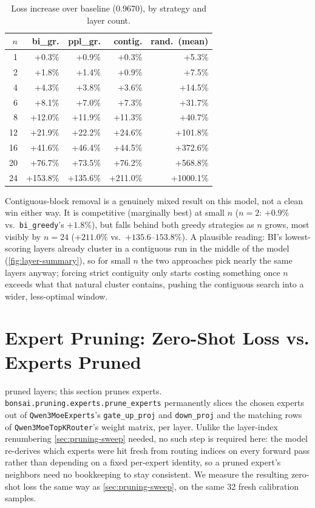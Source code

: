 \documentclass{article}
\theoremstyle{plain}
\theoremstyle{definition}
\theoremstyle{remark}
\begin{document}
\begin{table}[t]
\centering
\scriptsize
\setlength{\tabcolsep}{3pt}
\begin{tabular}{rrrrr}
\toprule
$n$ & bi\_gr. & ppl\_gr. & contig. & rand.\ (mean) \\
\midrule
1  & +0.3\%   & +0.9\%   & +0.3\%   & +5.3\%    \\
2  & +1.8\%   & +1.4\%   & +0.9\%   & +7.5\%    \\
4  & +4.3\%   & +3.8\%   & +3.6\%   & +14.5\%   \\
6  & +8.1\%   & +7.0\%   & +7.3\%   & +31.7\%   \\
8  & +12.0\%  & +11.9\%  & +11.3\%  & +40.7\%   \\
12 & +21.9\%  & +22.2\%  & +24.6\%  & +101.8\%  \\
16 & +41.6\%  & +46.4\%  & +44.5\%  & +372.6\%  \\
20 & +76.7\%  & +73.5\%  & +76.2\%  & +568.8\%  \\
24 & +153.8\% & +135.6\% & +211.0\% & +1000.1\% \\
\bottomrule
\end{tabular}
\caption{Loss increase over baseline (0.9670), by strategy and layer count.}
\label{table:pruning-sweep}
\end{table}

Contiguous-block removal is a genuinely mixed result on this model, not a
clean win either way. It is competitive (marginally best) at small $n$
($n=2$: $+0.9\%$ vs.\ \texttt{bi\_greedy}'s $+1.8\%$), but falls behind
both greedy strategies as $n$ grows, most visibly by $n=24$ ($+211.0\%$
vs.\ $+135.6$--$153.8\%$). A plausible reading: BI's lowest-scoring layers already
cluster in a contiguous run in the middle of the model
(\cref{fig:layer-summary}), so for small $n$ the two approaches pick
nearly the same layers anyway; forcing strict contiguity only starts
costing something once $n$ exceeds what that natural cluster contains,
pushing the contiguous search into a wider, less-optimal window.

\section{Expert Pruning: Zero-Shot Loss vs. Experts Pruned}
\label{sec:expert-pruning-sweep}

 pruned layers; this section prunes experts.
\texttt{bonsai.pruning.experts.prune\_experts} permanently slices the
chosen experts out of \texttt{Qwen3MoeExperts}'s \texttt{gate\_up\_proj}
and \texttt{down\_proj} and the matching rows of
\texttt{Qwen3MoeTopKRouter}'s weight matrix, per layer. Unlike the
layer-index renumbering \cref{sec:pruning-sweep} needed, no such step is
required here: the model re-derives which experts were hit fresh from
routing indices on every forward pass rather than depending on a fixed
per-expert identity, so a pruned expert's neighbors need no bookkeeping to
stay consistent. We measure the resulting
zero-shot loss the same way as \cref{sec:pruning-sweep}, on the same 32
fresh calibration samples.
\end{document}
